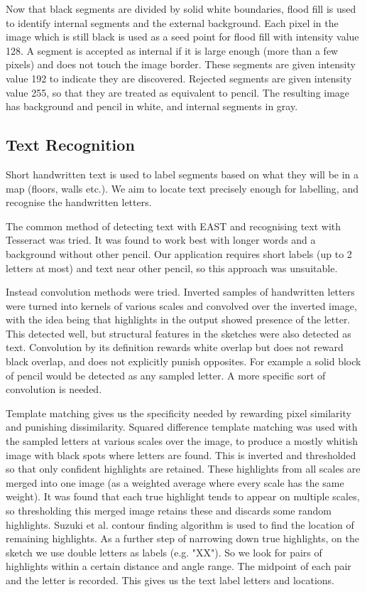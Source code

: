 \documentclass{IEEEtran}
\begin{document}
Now that black segments are divided by solid white boundaries, flood fill is used to identify internal segments and the external background. Each pixel in the image which is still black is used as a seed point for flood fill with intensity value 128. A segment is accepted as internal if it is large enough (more than a few pixels) and does not touch the image border. These segments are given intensity value 192 to indicate they are discovered. Rejected segments are given intensity value 255, so that they are treated as equivalent to pencil. The resulting image has background and pencil in white, and internal segments in gray.

\subsection{Text Recognition}
Short handwritten text is used to label segments based on what they will be in a map (floors, walls etc.). We aim to locate text precisely enough for labelling, and recognise the handwritten letters. 

The common method of detecting text with EAST and recognising text with Tesseract was tried. It was found to work best with longer words and a background without other pencil. Our application requires short labels (up to 2 letters at most) and text near other pencil, so this approach was unsuitable.

Instead convolution methods were tried. Inverted samples of handwritten letters were turned into kernels of various scales and convolved over the inverted image, with the idea being that highlights in the output showed presence of the letter. This detected well, but structural features in the sketches were also detected as text. Convolution by its definition rewards white overlap but does not reward black overlap, and does not explicitly punish opposites. For example a solid block of pencil would be detected as any sampled letter. A more specific sort of convolution is needed.

Template matching gives us the specificity needed by rewarding pixel similarity and punishing dissimilarity. Squared difference template matching was used with the sampled letters at various scales over the image, to produce a mostly whitish image with black spots where letters are found. This is inverted and thresholded so that only confident highlights are retained. These highlights from all scales are merged into one image (as a weighted average where every scale has the same weight). It was found that each true highlight tends to appear on multiple scales, so thresholding this merged image retains these and discards some random highlights. Suzuki et al. \cite{suzuki1985topological} contour finding algorithm is used to find the location of remaining highlights. As a further step of narrowing down true highlights, on the sketch we use double letters as labels (e.g. "XX"). So we look for pairs of highlights within a certain distance and angle range. The midpoint of each pair and the letter is recorded. This gives us the text label letters and locations.
\end{document}
